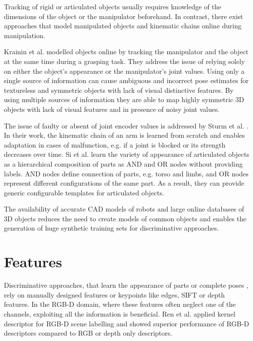Tracking of rigid or articulated objects usually requires knowledge of the dimensions of the object or the manipulator beforehand. In contrast, there exist approaches that model manipulated objects and kinematic chains online during manipulation.

Krainin et al. \cite{Krainin2011} modelled objects online by tracking the manipulator and the object at the same time during a grasping task.
They address the issue of relying solely on either the object's appearance or the manipulator's joint values. Using only a single source of information can cause ambiguous and incorrect pose estimates for textureless and symmetric objects with lack of visual distinctive features.
By using multiple sources of information they are able to map highly symmetric 3D objects with lack of visual features and in presence of noisy joint values.

The issue of faulty or absent of joint encoder values is addressed by Sturm et al. \cite{Sturm2009}. In their work, the kinematic chain of an arm is learned from scratch and enables adaptation in cases of malfunction, e.g. if a joint is blocked or its strength decreases over time.
Si et al. \cite{Si2013} learn the variety of appearance of articulated objects as a hierarchical composition of parts as AND and OR nodes without providing labels. AND nodes define connection of parts, e.g. torso and limbs, and OR nodes represent different configurations of the same part. As a result, they can provide generic configurable templates for articulated objects.

The availability of accurate CAD models of robots and large online databases of 3D objects \cite{Firman2016, Singh2014} reduces the need to create models of common objects and enables the generation of huge synthetic training sets for discriminative approaches.

\section{Features}
Discriminative approaches, that learn the appearance of parts \cite{Shotton2013, Krull2015, Pauwels2015} or complete poses \cite{Sharp2015}, rely on manually designed features or keypoints like edges, SIFT \cite{Pauwels2015, Morwald2010} or depth features. In the RGB-D domain, where these features often neglect one of the channels, exploiting all the information is beneficial. Ren et al. \cite{Ren2012} applied kernel descriptor for RGB-D scene labelling and showed superior performance of RGB-D descriptors compared to RGB or depth only descriptors.

